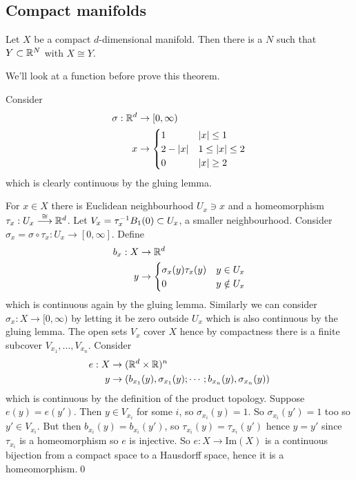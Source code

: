 \documentclass{article}
\newcommand{\homeo}{\overset{\cong}{\longrightarrow}}
\begin{document}
\subsection{Compact manifolds}
\begin{theorem}
	Let $ X $ be a compact $ d $-dimensional manifold. Then there is a $ N $ such that $ Y\subset \mathbb{R}^N $ with $ X\cong Y $.
\end{theorem}
We'll look at a function before prove this theorem.\par
Consider
\begin{align*}
	\sigma:\mathbb{R}^d&\to[0,\infty)\\
	x&\to \begin{cases}
		1 & |x| \le 1 \\
		2-|x| & 1 \le |x| \le 2 \\
		0 & |x| \ge 2
	\end{cases}
\end{align*}
which is clearly continuous by the gluing lemma.\par
\pf For $ x\in X $ there is Euclidean neighbourhood $ U_x \ni x$ and a homeomorphism $ \tau_x :U_x \homeo \R^d $. Let $ V_x={\tau}^{-1}_xB_1(0)\subset U_x $, a smaller neighbourhood. Consider $ \sigma_x = \sigma \circ \tau_x : U_x \to [0,\infty] $. Define
\begin{align*}
	b_x : X & \to \mathbb{R}^d \\
	y&\to \begin{cases}
		\sigma_x(y)\tau_x(y) & y \in U_x \\
		0 & y\notin U_x
	\end{cases}
\end{align*}
which is continuous again by the gluing lemma. Similarly we can consider $ \sigma_x: X \to [0,\infty) $ by letting it be zero outside $ U_x $ which is also continuous by the gluing lemma. The open sets $ V_x $ cover $ X $ hence by compactness there is a finite subcover $ V_{x_1},\dots, V_{x_n} $. Consider 
\begin{align*}
	e:X &\to (\mathbb{R}^d\times \mathbb{R})^n \\
y &\to (b_{x_1}(y),\sigma_{x_1}(y);\cdots; b_{x_n}(y),\sigma_{x_n}(y))
\end{align*}
	which is continuous by the definition of the product topology. Suppose $ e(y) = e(y') $. Then $ y\in V_{x_i} $ for some $ i $, so $ \sigma_{x_i}(y)=1 $. So $ \sigma_{x_i}(y') = 1 $ too so $ y'\in V_{x_i} $. But then $ b_{x_i}(y) = b_{x_i}(y') $, so $ \tau_{x_i}(y)=\tau_{x_i}(y') $ hence $ y=y' $ since $ \tau_{x_i} $ is a homeomorphism so $ e $ is injective. So $ e: X \to \text{Im}(X) $ is a continuous bijection from a compact space to a Hausdorff space, hence it is a homeomorphism.\qed
\end{document}
